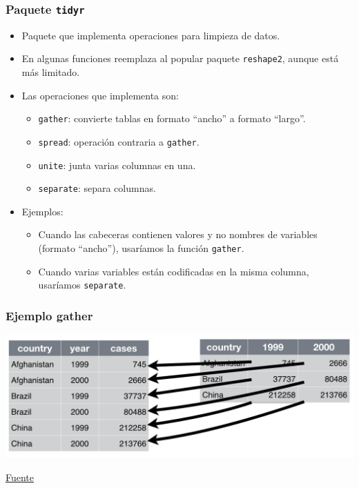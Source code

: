 \documentclass{beamer}
\begin{document}
\begin{frame}
\frametitle{Paquete \texttt{tidyr}}

\begin{itemize} %
\item Paquete que implementa operaciones para limpieza de datos.
\item En algunas funciones reemplaza al popular paquete \texttt{reshape2}, aunque está más limitado.
\item Las operaciones que implementa son:
\begin{itemize}
\item \texttt{gather}: convierte tablas en formato ``ancho'' a formato ``largo''.
\item \texttt{spread}: operación contraria a \texttt{gather}.
\item \texttt{unite}: junta varias columnas en una.
\item \texttt{separate}: separa columnas.
\end{itemize}
\item Ejemplos:
\begin{itemize}
\item Cuando las cabeceras contienen valores y no nombres de variables (formato ``ancho''), usaríamos la función \texttt{gather}.
\item Cuando varias variables están codificadas en la misma columna, usaríamos \texttt{separate}.
\end{itemize}
\end{itemize}
\end{frame}

\begin{frame}[fragile]
\frametitle{Ejemplo gather}
\begin{center}
\includegraphics[width=\textwidth]{tidyr-gather.png}

{\footnotesize \href{http://garrettgman.github.io/tidying/}{Fuente}}
\end{center}
\end{frame}
\end{document}
